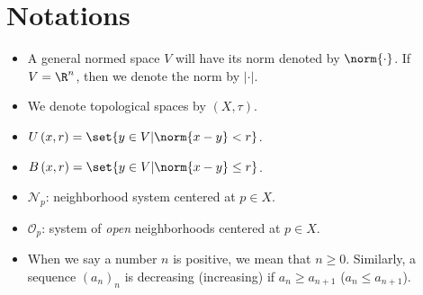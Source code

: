 \documentclass[10pt]{mypackage}
\begin{document}
\section{Notations}%
\begin{itemize}
  \item A general normed space $V$ will have its norm denoted by $\norm{\cdot}$. If $V = \R^{n}$, then we denote the norm by $ \left\vert \cdot \right\vert $.
  \item We denote topological spaces by $\left( X,\tau \right)$.
  \item $ U\left( x,r \right) = \set{y\in V | \norm{x-y} < r}$.
  \item $ B\left( x,r \right) = \set{y\in V | \norm{x-y} \leq r}$.
  \item $ \mathcal{N}_p $: neighborhood system centered at $p\in X$.
  \item $ \mathcal{O}_p $: system of \textit{open} neighborhoods centered at $p\in X$.
  \item When we say a number $n$ is positive, we mean that $n\geq 0$. Similarly, a sequence $\left( a_n \right)_n$ is decreasing (increasing) if $a_n\geq a_{n+1}$ ($a_n\leq a_{n+1}$).
\end{itemize}
\end{document}
